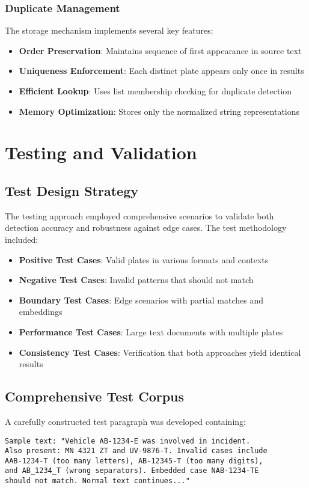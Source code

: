 \documentclass[12pt,a4paper]{article}
\begin{document}
\subsubsection{Duplicate Management}
The storage mechanism implements several key features:
\begin{itemize}
    \item \textbf{Order Preservation}: Maintains sequence of first appearance in source text
    \item \textbf{Uniqueness Enforcement}: Each distinct plate appears only once in results
    \item \textbf{Efficient Lookup}: Uses list membership checking for duplicate detection
    \item \textbf{Memory Optimization}: Stores only the normalized string representations
\end{itemize}

\section{Testing and Validation}
\subsection{Test Design Strategy}
The testing approach employed comprehensive scenarios to validate both detection accuracy and robustness against edge cases. The test methodology included:

\begin{itemize}
    \item \textbf{Positive Test Cases}: Valid plates in various formats and contexts
    \item \textbf{Negative Test Cases}: Invalid patterns that should not match
    \item \textbf{Boundary Test Cases}: Edge scenarios with partial matches and embeddings
    \item \textbf{Performance Test Cases}: Large text documents with multiple plates
    \item \textbf{Consistency Test Cases}: Verification that both approaches yield identical results
\end{itemize}

\subsection{Comprehensive Test Corpus}
A carefully constructed test paragraph was developed containing:
\begin{lstlisting}[frame=single, backgroundcolor=\color{gray!10}, caption=Sample Test Input]
Sample text: "Vehicle AB-1234-E was involved in incident. 
Also present: MN 4321 ZT and UV-9876-T. Invalid cases include 
AAB-1234-T (too many letters), AB-12345-T (too many digits), 
and AB_1234_T (wrong separators). Embedded case NAB-1234-TE 
should not match. Normal text continues..."
\end{lstlisting}
\end{document}
